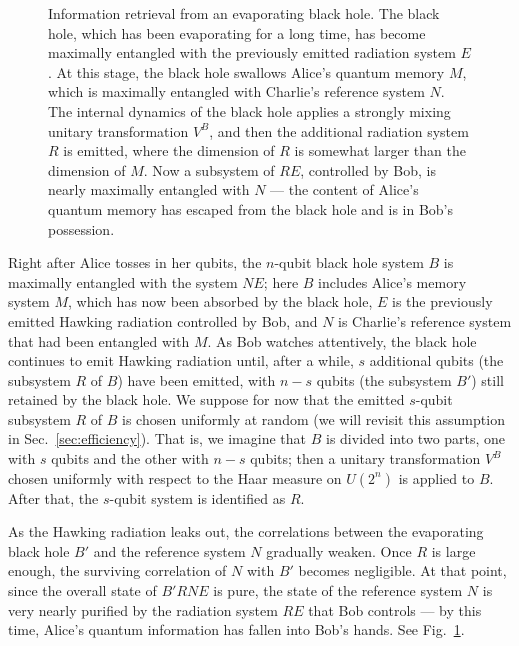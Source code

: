 \documentclass[12pt]{article}
\begin{document}
\begin{figure}
\begin{center}
\leavevmode
\epsfxsize=3.5in
\end{center}
\caption{Information retrieval from an evaporating black hole. The black hole, which has been evaporating for a long time, has become maximally entangled with the previously emitted radiation system $E$. At this stage, the black hole swallows Alice's quantum memory $M$, which is maximally entangled with Charlie's reference system $N$. The internal dynamics of the black hole applies a strongly mixing unitary transformation $V^B$, and then the additional radiation system $R$ is emitted, where the dimension of $R$ is somewhat larger than the dimension of $M$. Now a subsystem of $RE$, controlled by Bob, is nearly maximally entangled with $N$ --- the content of Alice's quantum memory has escaped from the black hole and is in Bob's possession.}
\label{fig:retrieval}
\end{figure}

Right after Alice tosses in her qubits, the $n$-qubit black hole system $B$ is maximally entangled with the system $NE$; here $B$ includes Alice's memory system $M$, which has now been absorbed by the black hole,  $E$ is the previously emitted Hawking radiation controlled by Bob, and $N$ is Charlie's reference system that had been entangled with $M$. As Bob watches attentively, the black hole continues to emit Hawking radiation until, after a while, $s$ additional qubits (the subsystem $R$ of $B$) have been emitted, with $n-s$ qubits (the subsystem $B'$) still retained by the black hole. We suppose for now that the emitted $s$-qubit subsystem $R$ of $B$ is chosen uniformly at random (we will revisit this assumption in Sec.~\ref{sec:efficiency}). That is, we imagine that  $B$ is divided into two parts, one with $s$ qubits and the other with $n-s$ qubits; then a unitary transformation $V^B$ chosen uniformly with respect to the Haar measure on $U(2^n)$ is applied to $B$. After that, the $s$-qubit system is identified as $R$.

As the Hawking radiation leaks out, the correlations between the evaporating black hole $B'$ and the reference system $N$ gradually weaken. Once $R$ is large enough, the surviving correlation of $N$ with $B'$ becomes negligible. At that point, since the overall state of $B'RNE$ is pure, the state of the reference system $N$ is very nearly purified by the radiation system $RE$ that Bob controls --- by this time, Alice's quantum information has fallen into Bob's hands. See Fig.~\ref{fig:retrieval}.
\end{document}
